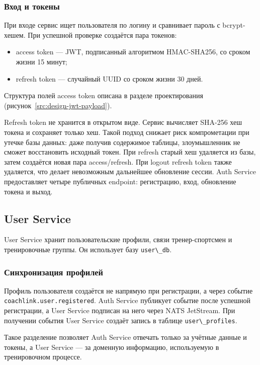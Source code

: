 \subsubsection{Вход и токены}

При входе сервис ищет пользователя по логину и сравнивает пароль с bcrypt-хешем. При успешной проверке создаётся пара токенов:

\begin{itemize}
\tightlist
\item
  access token --- JWT, подписанный алгоритмом HMAC-SHA256, со сроком жизни 15 минут;
\item
  refresh token --- случайный UUID со сроком жизни 30 дней.
\end{itemize}

Структура полей access token описана в разделе проектирования (рисунок~\ref{src:design-jwt-payload}).

Refresh token не хранится в открытом виде. Сервис вычисляет SHA-256 хеш токена и сохраняет только хеш. Такой подход снижает риск компрометации при утечке базы данных: даже получив содержимое таблицы, злоумышленник не сможет восстановить исходный токен. При refresh старый хеш удаляется из базы, затем создаётся новая пара access/refresh. При logout refresh token также удаляется, что делает невозможным дальнейшее обновление сессии. Auth Service предоставляет четыре публичных endpoint: регистрацию, вход, обновление токена и выход.

\subsection{User Service}

User Service хранит пользовательские профили, связи тренер-спортсмен и тренировочные группы. Он использует базу \passthrough{\lstinline!user\_db!}.

\subsubsection{Синхронизация профилей}

Профиль пользователя создаётся не напрямую при регистрации, а через событие \passthrough{\lstinline!coachlink.user.registered!}. Auth Service публикует событие после успешной регистрации, а User Service подписан на него через NATS JetStream. При получении события User Service создаёт запись в таблице \passthrough{\lstinline!user\_profiles!}.

Такое разделение позволяет Auth Service отвечать только за учётные данные и токены, а User Service --- за доменную информацию, используемую в тренировочном процессе.

